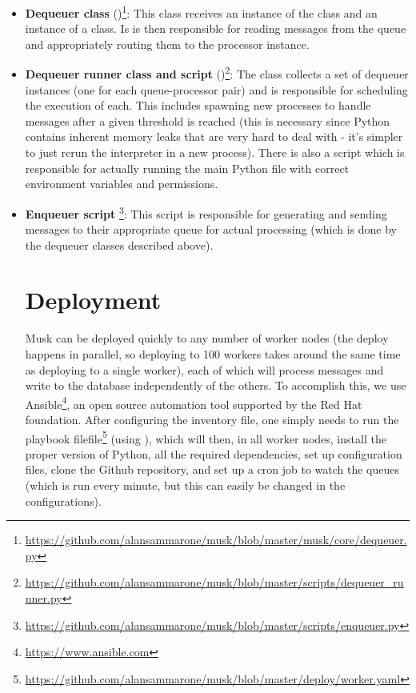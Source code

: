 \begin{itemize}
    \raggedright\item \textbf{Dequeuer class} ()\footnote{\url{https://github.com/alansammarone/musk/blob/master/musk/core/dequeuer.py}}: This class receives an instance of the  class and an instance of a  class. Is is then responsible for reading messages from the queue and appropriately routing them to the processor instance. 
    
    
    \raggedright\item\textbf{Dequeuer runner class and script} ()\footnote{\url{https://github.com/alansammarone/musk/blob/master/scripts/dequeuer_runner.py}}: The  class collects a set of dequeuer instances (one for each queue-processor pair) and is responsible for scheduling the execution of each. This includes spawning  new processes to handle messages after a given threshold is reached (this is necessary since Python contains inherent memory leaks that are very hard to deal with - it's simpler to just rerun the interpreter in a new process). There is also a  script which is responsible for actually running the main Python file with correct environment variables and permissions.
    
    \raggedright\item \textbf{Enqueuer script} \footnote{\url{https://github.com/alansammarone/musk/blob/master/scripts/enqueuer.py}}: This script is responsible for generating and sending messages to their appropriate queue for actual processing (which is done by the dequeuer classes described above).
    
    
\section{Deployment}

Musk can be deployed quickly to any number of worker nodes (the deploy happens in parallel, so deploying to 100 workers takes around the same time as deploying to a single worker), each of which will process messages and write to the database independently of the others. To accomplish this, we use Ansible\footnote{\url{https://www.ansible.com}}, an open source automation tool supported by the Red Hat foundation. After configuring the inventory file, one simply needs to run the playbook filefile\footnote{\url{https://github.com/alansammarone/musk/blob/master/deploy/worker.yaml}} (using ), which will then, in all worker nodes, install the proper version of Python, all the required dependencies, set up configuration files, clone the Github repository, and set up a cron job to watch the queues (which is run every minute, but this can easily be changed in the configurations).

\end{itemize}


